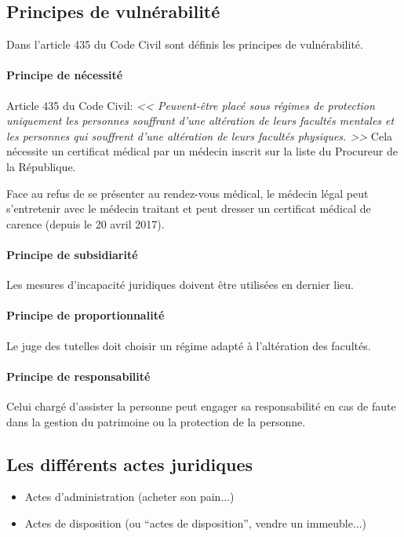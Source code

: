 \documentclass[10pt,a4paper]{article}
\begin{document}
\subsection{Principes de vulnérabilité}

Dans l'article 435 du Code Civil sont définis les principes de vulnérabilité.

\paragraph{Principe de nécessité} Article 435 du Code Civil: \textit{<< Peuvent-être placé sous régimes de protection uniquement les personnes souffrant d'une altération de leurs facultés mentales et les personnes qui souffrent d'une altération de leurs facultés physiques. >>} Cela nécessite un certificat médical par un médecin inscrit sur la liste du Procureur de la République.

Face au refus de se présenter au rendez-vous médical, le médecin légal peut s'entretenir avec le médecin traitant et peut dresser un certificat médical de carence (depuis le 20 avril 2017).

\paragraph{Principe de subsidiarité}
Les mesures d'incapacité juridiques doivent être utilisées en dernier lieu.

\paragraph{Principe de proportionnalité}

Le juge des tutelles doit choisir un régime adapté à l'altération des facultés.

\paragraph{Principe de responsabilité}

Celui chargé d'assister la personne peut engager sa responsabilité en cas de faute dans la gestion du patrimoine ou la protection de la personne.

\subsection{Les différents actes juridiques}

\begin{itemize}
\item Actes d'administration (acheter son pain...)
\item Actes de disposition (ou ``actes de disposition'', vendre un immeuble...)
\end{itemize}
\end{document}
